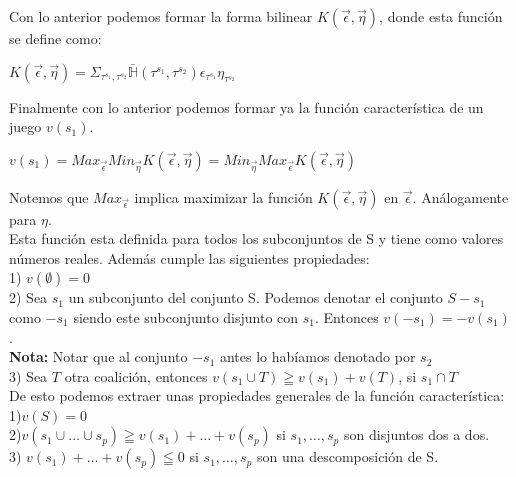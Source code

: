 \documentclass[10pt,a4paper]{book}
\begin{document}
Con lo anterior podemos formar la forma bilinear $K(\overrightarrow{\epsilon},\overrightarrow{\eta})$, donde esta función se define como:\\
\begin{center}

$K(\overrightarrow{\epsilon},\overrightarrow{\eta})=\Sigma_{\tau^{s_1},\tau^{s_2}} \bar{\mathbb{H}}(\tau^{s_1},\tau^{s_2})\epsilon_{\tau^{s_1}}\eta_{\tau^{s_2}}$

\end{center}

Finalmente con lo anterior podemos formar ya la función característica de un juego $v(s_1)$.\\

\begin{center}

$v(s_1) = Max_{\overrightarrow{\epsilon}} Min_{\overrightarrow{\eta}} K(\overrightarrow{\epsilon},\overrightarrow{\eta}) =  Min_{\overrightarrow{\eta}} Max_{\overrightarrow{\epsilon}} K(\overrightarrow{\epsilon},\overrightarrow{\eta})$

\end{center}

Notemos que $Max_{\overrightarrow{\epsilon}}$ implica maximizar la función $K(\overrightarrow{\epsilon},\overrightarrow{\eta})$ en $\overrightarrow{\epsilon}$. Análogamente para $\eta$.\\

Esta función esta definida para todos los subconjuntos de S y tiene como valores números reales. Además cumple las siguientes propiedades:\\

1) $v(\emptyset) = 0$\\
2) Sea $s_1$ un subconjunto del conjunto S. Podemos denotar el conjunto $S - s_1$ como $-s_1$ siendo este subconjunto disjunto con $s_1$. Entonces $v(-s_1)=-v(s_1)$.\\
\textbf{Nota:} Notar que al conjunto $-s_1$ antes lo habíamos denotado por $s_2$\\
3) Sea $T$ otra coalición, entonces $v(s_1 \cup T) \geqq v(s_1) + v(T)$, si $s_1 \cap T$\\

De esto podemos extraer unas propiedades generales de la función característica:\\
1)$v(S)=0$\\
2)$v(s_1 \cup \ldots \cup s_p) \geqq v(s_1)+ \ldots + v(s_p) $ si $s_1, \ldots , s_p$ son disjuntos dos a dos.\\
3) $v(s_1)+ \ldots + v(s_p)  \leqq 0$ si $s_1, \ldots , s_p$ son una descomposición de S.\\
\end{document}
